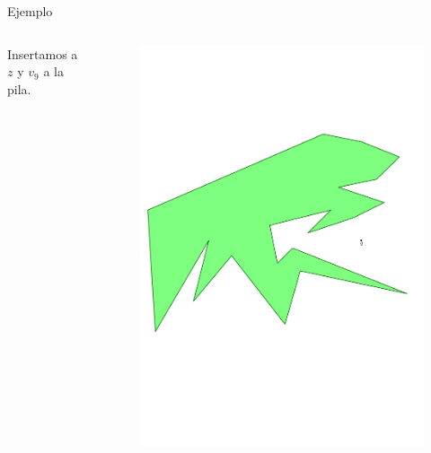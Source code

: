 \documentclass[aspectratio=169,xcolor=dvipsnames, t]{beamer}
\begin{document}
\begin{frame}{Ejemplo}
  \begin{columns}
    \begin{column}{0.3\textwidth}
      \raggedright %
      Insertamos a $z$ y $v_{9}$ a la pila.
    \end{column}
    \begin{column}{0.7\textwidth}
      \vspace{-2.5cm} %
      \begin{figure}
        \centering
        \includegraphics[width=1\linewidth, height=.95\textheight, page=20, keepaspectratio]{IPE/point_visibility.pdf}
      \end{figure}
    \end{column}
  \end{columns}
\end{frame}
\end{document}
